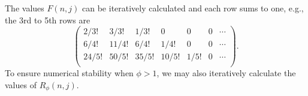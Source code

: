 \documentclass[journal]{IEEEtran}
\begin{document}
The values $F(n,j)$ can be iteratively calculated and each row sums to one, e.g.,
the 3rd to 5th rows are
\[ \left( \begin{array}{ccccccc}
2/3! & 3/3! & 1/3! & 0 & 0 & 0& \cdots \\
6/4! & 11/4! & 6/4! & 1/4! & 0 & 0& \cdots \\
24/5! & 50/5! & 35/5! & 10/5! & 1/5! & 0& \cdots \\
\end{array} \right).\]
To ensure numerical stability when $\phi>1$, we may also iteratively calculate the values of $R_\phi(n,j)$.

\small%



%
%
%





\end{document}
